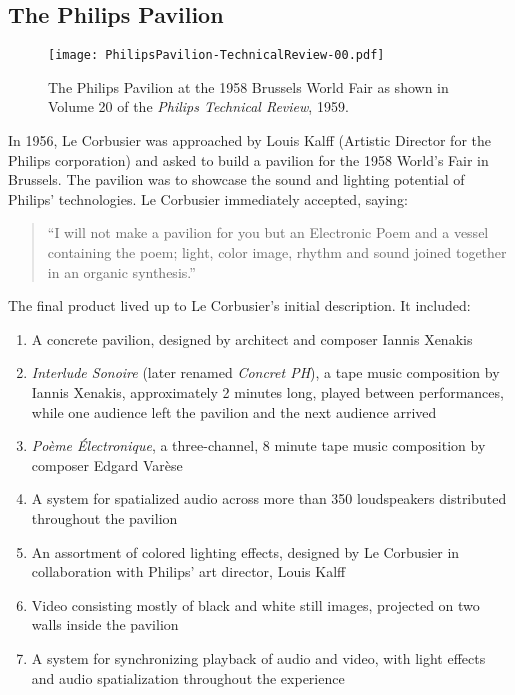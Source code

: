 \subsection{The Philips Pavilion}
\label{sec:philips-pavilion-1}
\begin{figure}[h]
  \texttt{[image: PhilipsPavilion-TechnicalReview-00.pdf]}
  \caption{The Philips Pavilion at the 1958 Brussels World Fair as
    shown in Volume 20 of the \textit{Philips Technical Review}, 1959.}
  \label{fig:philips-pavilion-photo}
\end{figure}
In 1956, Le Corbusier was approached by Louis Kalff (Artistic Director
for the Philips corporation) and asked to build a pavilion for the
1958 World's Fair in Brussels. The pavilion was to showcase the sound
and lighting potential of Philips' technologies. Le Corbusier
immediately accepted, saying:
\begin{quotation}
  ``I will not make a pavilion for you but an Electronic Poem and a
  vessel containing the poem; light, color image, rhythm and sound
  joined together in an organic synthesis.''\cite{Lopez2011} 
\end{quotation}
The final product lived up to Le Corbusier's initial description. It
included:\cite{Lombardo2009}
\begin{enumerate}
\item A concrete pavilion, designed by architect and composer Iannis
  Xenakis
\item \textit{Interlude Sonoire} (later renamed \textit{Concret PH}), a
  tape music composition by Iannis Xenakis, approximately 2 minutes
  long, played between performances, while one audience left the
  pavilion and the next audience arrived
\item \textit{Po\`{e}me \'{E}lectronique}, a three-channel, 8 minute
  tape music composition by composer Edgard Var\`{e}se
\item A system for spatialized audio across more than 350 loudspeakers
  distributed throughout the pavilion
\item An assortment of colored lighting effects, designed by Le Corbusier in
  collaboration with Philips' art director, Louis Kalff
\item Video consisting mostly of black and white still images,
  projected on two walls inside the pavilion
\item A system for synchronizing playback of audio and video,
  with light effects and audio spatialization throughout the
  experience
\end{enumerate} 

